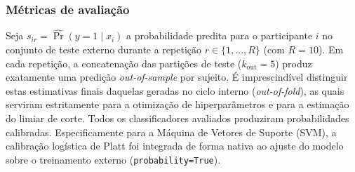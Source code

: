 \documentclass[review]{elsarticle}
\newcommand{\code}[1]{\texttt{#1}}
\begin{document}
%


\subsubsection{Métricas de avaliação}\label{subsubsec:evaluation-metrics}

Seja $s_{ir}=\widehat{\Pr}(y=1\mid x_i)$ a probabilidade predita para o participante $i$ no conjunto de teste externo durante a repetição $r\in\{1,\ldots,R\}$ (com $R=10$). Em cada repetição, a concatenação das partições de teste ($k_{\mathrm{out}}=5$) produz exatamente uma predição \emph{out-of-sample} por sujeito. É imprescindível distinguir estas estimativas finais daquelas geradas no ciclo interno (\emph{out-of-fold}), as quais serviram estritamente para a otimização de hiperparâmetros e para a estimação do limiar de corte. Todos os classificadores avaliados produziram probabilidades calibradas. Especificamente para a Máquina de Vetores de Suporte (SVM), a calibração logística de Platt foi integrada de forma nativa ao ajuste do modelo sobre o treinamento externo (\code{probability=True}).
\end{document}
